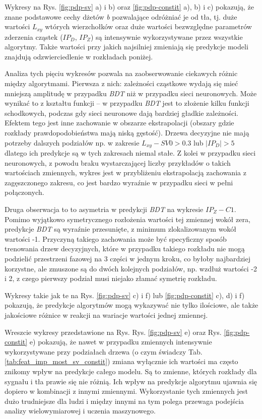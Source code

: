 \vspace{1em}
Wykresy na Rys. \ref{fig:pdp-sv} a) i b) oraz \ref{fig:pdp-constit} a), b) i c) pokazują, że znane podstawowe cechy dżetów \textit{b} pozwalające odróżniać je od tła, tj. duże wartości $L_{xy}$ wtórych wierzchołków oraz duże wartości bezwzględne parametrów zderzenia cząstek ($IP_D$, $IP_Z$) są intensywnie wykorzystywane przez wszystkie algorytmy. Także wartości przy jakich najsilniej zmieniają się predykcje modeli znajdują odzwierciedlenie w rozkładach poniżej.

Analiza tych pięciu wykresów pozwala na zaobserwowanie ciekawych różnic między algorytmami.
Pierwsza z nich: zależności cząstkowe wydają się mieć mniejszą amplitudę w przypadku \textit{BDT} niż w przypadku sieci neuronowych. Może wynikać to z kształtu funkcji -- w przypadku \textit{BDT} jest to złożenie kilku funkcji schodkowych, podczas gdy sieci neuronowe dają bardziej gładkie zależności. Efektem tego jest inne zachowanie w obszarze ekstrapolacji (obszary gdzie rozkłady prawdopodobieństwa mają niską gęstość). Drzewa decyzyjne nie mają potrzeby dalszych podziałów np. w zakresie $L_{xy} - SV0 > 0.3$ lub $|IP_D| > 5$ dlatego ich predykcje są w tych zakresach niemal stałe. Z kolei w przypadku sieci neuronowych, z powodu braku wystarczającej liczby przykładów o takich wartościach zmiennych, wykres jest w przybliżeniu ekstrapolacją zachowania z zagęszczonego zakresu, co jest bardzo wyraźnie w przypadku sieci w pełni połączonych. 

Druga obserwacja to to asymetria w predykcji \textit{BDT} na wykresie $IP_Z - C1$. Pomimo wyjątkowo symetrycznego rozłożenia wartości tej zmiennej wokół zera, predykcje \textit{BDT} są wyraźnie przesunięte, z minimum zlokalizowanym wokół wartości -1.
Przyczyną takiego zachowania może być specyficzny sposób trenowania drzew decyzyjnych, które w przypadku takiego rozkładu nie mogą podzielić przestrzeni fazowej na 3 części w jednym kroku, co byłoby najbardziej korzystne, ale zmuszone są do dwóch kolejnych podziałów, np. wzdłuż wartości -2 i 2, z czego pierwszy podział musi niejako złamać symetrię rozkładu.

Wykresy takie jak te na Rys. \ref{fig:pdp-sv} c) i f) lub \ref{fig:pdp-constit} c), d) i f) pokazują, że predykcje algorytmów mogą wykazywać nie tylko ilościowe, ale także jakościowe różnice w reakcji na wariacje wartości jednej zmiennej.

Wreszcie wykresy przedstawione na Rys. Rys. \ref{fig:pdp-sv} e) oraz Rys. \ref{fig:pdp-constit} e) pokazują, że nawet w przypadku zmiennych intensywnie wykorzystywane przy podziałach drzewa (o czym świadczy Tab. \ref{tab:feat_imp_most_sv_constit}) zmiana wyłącznie ich wartości ma często znikomy wpływ na predykcje całego modelu. Są to zmienne, których rozkłady dla sygnału i tła prawie się nie różnią. Ich wpływ na predykcje algorytmu ujawnia się dopiero w kombinacji z innymi zmiennymi. Wykorzystanie tych zmiennych jest dużo trudniejsze dla ludzi i między innymi na tym polega przewaga podejścia analizy wielowymiarowej i uczenia maszynowego.

